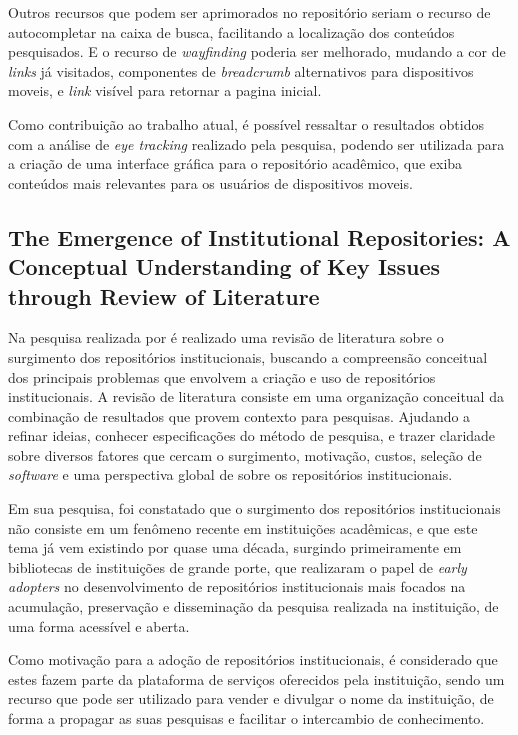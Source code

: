 Outros recursos que podem ser aprimorados no repositório seriam
o recurso de autocompletar na caixa de busca, facilitando a localização
dos conteúdos pesquisados. E o recurso de \emph{wayfinding} poderia ser
melhorado, mudando a cor de \emph{links} já visitados, componentes
de \emph{breadcrumb} alternativos para dispositivos moveis, e
\emph{link} visível para retornar a pagina inicial.

Como contribuição ao trabalho atual, é possível ressaltar o resultados
obtidos com a análise de \emph{eye tracking} realizado pela pesquisa,
podendo ser utilizada para a criação de uma interface gráfica para
o repositório acadêmico, que exiba conteúdos mais relevantes para
os usuários de dispositivos moveis.

\subsection{The Emergence of Institutional Repositories: A Conceptual Understanding of Key Issues through Review of Literature}

Na pesquisa realizada por \cite{Saini:2018} é realizado uma revisão de
literatura sobre o surgimento dos repositórios institucionais,
buscando a compreensão conceitual dos principais problemas que envolvem
a criação e uso de repositórios institucionais. A revisão de literatura
consiste em uma organização conceitual da combinação de resultados que provem
contexto para pesquisas. Ajudando a refinar ideias, conhecer especificações do
método de pesquisa, e trazer claridade sobre diversos fatores que cercam o
surgimento, motivação, custos, seleção de \emph{software} e uma perspectiva global
de sobre os repositórios institucionais.

Em sua pesquisa, foi constatado que o surgimento dos repositórios institucionais
não consiste em um fenômeno recente em instituições acadêmicas, e que este tema já vem
existindo por quase uma década, surgindo primeiramente em bibliotecas de instituições
de grande porte, que realizaram o papel de \emph{early adopters} no desenvolvimento
de repositórios institucionais mais focados na acumulação, preservação e disseminação
da pesquisa realizada na instituição, de uma forma acessível e aberta.

Como motivação para a adoção de repositórios institucionais, é considerado
que estes fazem parte da plataforma de serviços oferecidos pela instituição,
sendo um recurso que pode ser utilizado para vender e divulgar o nome da instituição,
de forma a propagar as suas pesquisas e facilitar o intercambio de conhecimento.

